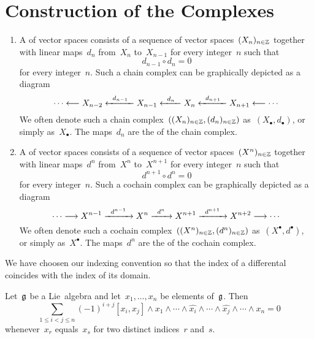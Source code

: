 \section{Construction of the Complexes}

\begin{recall}
	\leavevmode
	\begin{enumerate}
		\item
			A  of vector spaces consists of a sequence of vector spaces~$(X_n)_{n \in \mathbb{Z}}$ together with linear maps~$d_n$ from~$X_n$ to~$X_{n-1}$ for every integer~$n$ such that
			\[
				d_{n-1} \circ d_n = 0
			\]
			for every integer~$n$.
			Such a chain complex can be graphically depicted as a diagram
			\[
				\dotsb
				\from
				X_{n-2}
				\xfrom{d_{n-1}}
				X_{n-1}
				\xfrom{d_n}
				X_n
				\xfrom{d_{n+1}}
				X_{n+1}
				\from
				\dotsb
			\]
			We often denote such a chain complex~$( (X_n)_{n \in \mathbb{Z}}, (d_n)_{n \in \mathbb{Z}} )$ as~$(X_\bullet, d_\bullet)$, or simply as~$X_\bullet$.
			The maps~$d_n$ are the  of the chain complex.
		\item
			A  of vector spaces consists of a sequence of vector spaces~$(X^n)_{n \in \mathbb{Z}}$ together with linear maps~$d^n$ from~$X^n$ to~$X^{n+1}$ for every integer~$n$ such that
			\[
				d^{n+1} \circ d^n = 0
			\]
			for every integer~$n$.
			Such a cochain complex can be graphically depicted as a diagram
			\[
				\dotsb
				\to
				X^{n-1}
				\xto{d^{n-1}}
				X^n
				\xto{d^n}
				X^{n+1}
				\xto{d^{n+1}}
				X^{n+2}
				\to
				\dotsb
			\]
			We often denote such a cochain complex~$( (X^n)_{n \in \mathbb{Z}}, (d^n)_{n \in \mathbb{Z}} )$ as~$(X^\bullet, d^\bullet)$, or simply as~$X^\bullet$.
			The maps~$d^n$ are the  of the cochain complex.
	\end{enumerate}
\end{recall}


\begin{remark}
	We have choosen our indexing convention so that the index of a differental coincides with the index of its domain.
\end{remark}


\begin{lemma}
	\label{alternating in multiple arguments}
	Let~$\mathfrak{g}$ be a Lie~algebra and let~$x_1, \dotsc, x_n$ be elements of~$\mathfrak{g}$.
	Then
	\begin{equation}
		\label{generalization of alternating}
		\sum_{1 \leq i < j \leq n}
		(-1)^{i+j}
		[x_i, x_j] \wedge x_1 \wedge \dotsb \wedge \widehat{x_i} \wedge \dotsb \wedge \widehat{x_j} \wedge \dotsb \wedge x_n
		=
		0
	\end{equation}
	whenever~$x_r$ equals~$x_s$ for two distinct indices~$r$ and~$s$.
\end{lemma}


